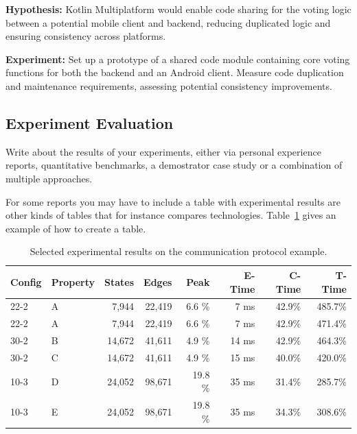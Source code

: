 \textbf{Hypothesis:} Kotlin Multiplatform would enable code sharing for the voting logic between a potential mobile client and backend, reducing duplicated logic and ensuring consistency across platforms.

\textbf{Experiment:} Set up a prototype of a shared code module containing core voting functions for both the backend and an Android client. Measure code duplication and maintenance requirements, assessing potential consistency improvements.


\subsection{Experiment Evaluation}

Write about the results of your experiments, either via personal experience reports, quantitative benchmarks, a demostrator case study or a combination of multiple approaches.


For some reports you may have to include a table with experimental
results are other kinds of tables that for instance compares
technologies. Table~\ref{tab:results} gives an example of how to create a table.

\begin{table}[bth]
	\centering
	\begin{tabular}{llrrrrrr}
		Config & Property & States & Edges & Peak & E-Time & C-Time & T-Time
		\\ \hline \hline
		22-2 & A   &    7,944  &   22,419  &  6.6  \%  &  7 ms & 42.9\% &  485.7\% \\
		22-2 & A   &    7,944  &   22,419  &  6.6  \%  &  7 ms & 42.9\% &  471.4\% \\
		30-2 & B   &   14,672  &   41,611  &  4.9  \%  & 14 ms & 42.9\% &  464.3\% \\
		30-2 & C   &   14,672  &   41,611  &  4.9  \%  & 15 ms & 40.0\% &  420.0\% \\ \hline
		10-3 & D   &   24,052  &   98,671  & 19.8  \%  & 35 ms & 31.4\% &  285.7\% \\
		10-3 & E   &   24,052  &   98,671  & 19.8  \%  & 35 ms & 34.3\% &  308.6\% \\
		\hline \hline
	\end{tabular}
	\caption{Selected experimental results on the communication protocol example.}
	\label{tab:results}
\end{table}
